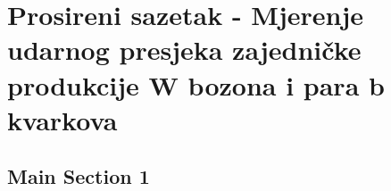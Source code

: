 
\chapter{Prosireni sazetak - Mjerenje udarnog presjeka zajedničke produkcije W bozona i para b kvarkova} %

\label{Chapter9} %



\section{Main Section 1}


